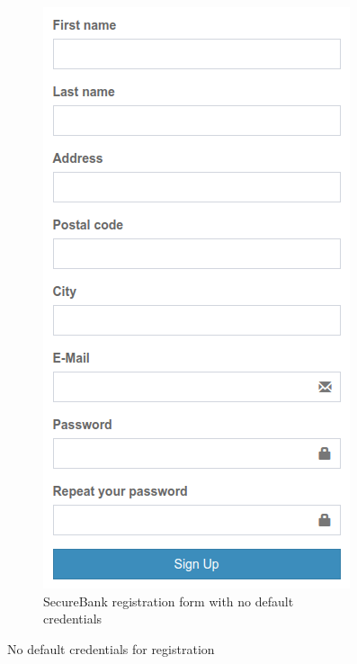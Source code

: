 \begin{figure}[ht]
\begin{subfigure}{.45\textwidth}
		\includegraphics[width=.8\linewidth]{figures/OTG-AUTHN-002_2.png}
		\caption{SecureBank registration form with no default credentials}
	\end{subfigure}
	\caption{No default credentials for registration}
	\label{fig:registration}
\end{figure}
\clearpage